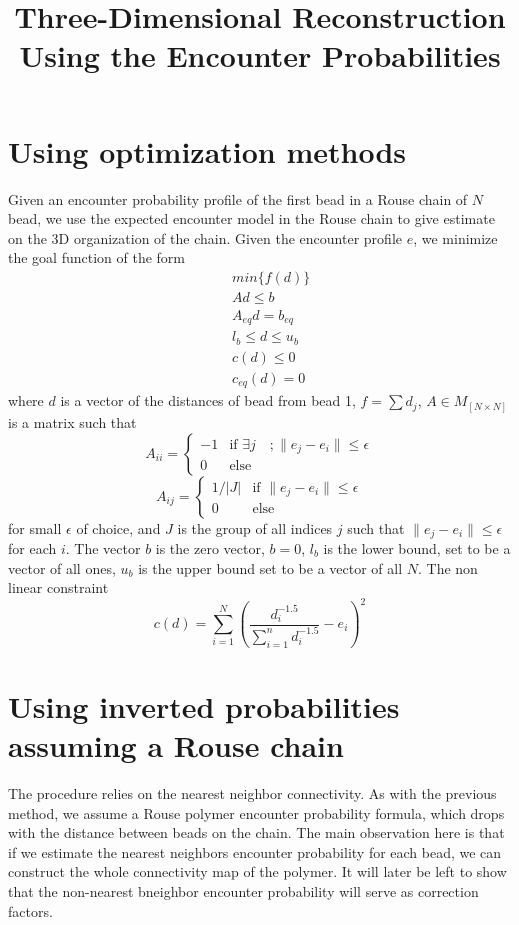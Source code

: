 \documentclass[12pt]{article}
\title{Three-Dimensional Reconstruction Using the Encounter Probabilities}
\begin{document}
\maketitle
\section{Using optimization methods}
Given an encounter probability profile of the first bead in a Rouse chain of $N$ bead, we use the expected encounter model in the Rouse chain to give estimate on the 3D organization of the chain. Given the encounter profile $e$, we minimize the goal function of the form
\begin{eqnarray}
&& min\{f(d)\}\\
&& Ad\leq b\\
&& A_{eq}d=b_{eq}\\
&& l_b\leq d\leq u_b\\
&& c(d)\leq0\\
&& c_{eq}(d)=0
\end{eqnarray}
where $d$ is a vector of the distances of bead from bead 1, $f=\sum{d_j}$, $A\in M_{[N\times N]}$ is a matrix such that
\begin{equation}
A_{ii} =
\left\{
	\begin{array}{ll}
		 -1 & \mbox{if } \exists j \quad ;\|e_j-e_i\|\leq \epsilon \\
		 0 & \mbox{else} 
	\end{array}
\right.
\end{equation}
\begin{equation}
A_{ij} =
\left\{
	\begin{array}{ll}
		1/|J|  & \mbox{if } \|e_j-e_i\|\leq \epsilon \\
		0 & \mbox{else } 
	\end{array}
\right.
\end{equation}
for small $\epsilon$ of choice, and $J$ is the group of all indices $j$ such that $\|e_j-e_i\|\leq \epsilon$ for each $i$. The vector $b$ is the zero vector,  $b=0$, $l_b$ is the lower bound, set to be a vector of all ones, $u_b$ is the upper bound set to be a vector of all $N$. The non linear constraint 
\begin{equation}
c(d) = \sum_{i=1}^N \left(\frac{d_i^{-1.5}}{\sum_{i=1}^n d_i^{-1.5}}-e_i\right)^2
\end{equation}

\section{Using inverted probabilities assuming a Rouse chain}
The procedure relies on the nearest neighbor connectivity. As with the previous method, we assume a Rouse polymer encounter probability formula, which drops with the distance between beads on the chain. The main observation here is that if we estimate the nearest neighbors encounter probability for each bead, we can construct the whole connectivity map of the polymer. It will later be left to show that the non-nearest bneighbor encounter probability will serve as correction factors.
\end{document}
